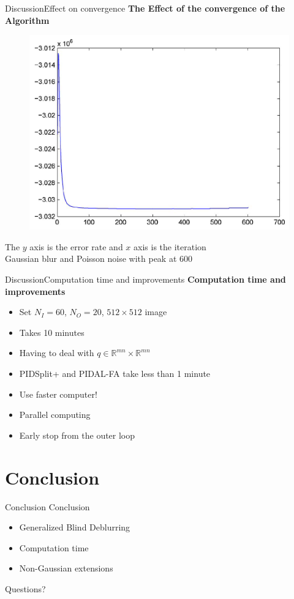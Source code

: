 \documentclass{beamer}
\begin{document}
\begin{frame}[t]{Discussion}{Effect on convergence}
    \textbf{The Effect of the convergence of the Algorithm}
    \begin{figure}
        \centering
        \includegraphics[scale=0.33]{objective_func.png}
    \end{figure}
    \footnotesize{
        The $y$ axis is the error rate and $x$ axis is the iteration \\
        Gaussian blur and Poisson noise with peak at 600
    }
\end{frame}

\begin{frame}[t]{Discussion}{Computation time and improvements}
\textbf{Computation time and improvements}
\begin{itemize}
    \item Set $N_I=60$, $N_O=20$, $512\times 512$ image
    \item Takes 10 minutes
    \item Having to deal with $q \in \mathbb{R}^{mn} \times \mathbb{R}^{mn}$
    \item PIDSplit+ and PIDAL-FA take less than 1 minute
    \item Use faster computer!
    \item Parallel computing
    \item Early stop from the outer loop
\end{itemize}
\end{frame}

\section{Conclusion}
\begin{frame}[t]{Conclusion}
Conclusion

\begin{itemize}
    \item Generalized Blind Deblurring 
    \item Computation time 
    \item Non-Gaussian extensions
\end{itemize}
\end{frame}

\begin{frame}{}

\vspace{3cm}

Questions?
    
\end{frame}
\end{document}
